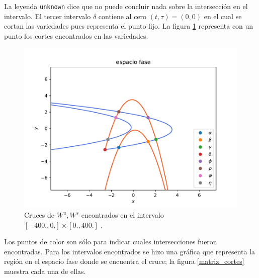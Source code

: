La leyenda \texttt{unknown} dice que no puede concluir nada sobre la intersección en el intervalo. El tercer intervalo $\delta$ contiene al cero $(t,\tau)=(0,0)$ en el cual se cortan las variedades pues representa el punto fijo. La figura \ref{crucesH} representa con un punto los cortes encontrados en las variedades.
\begin{figure}[H]
\centering
\includegraphics[scale=0.7]{crucesL}
\caption{Cruces de $W^{u},W^{s}$ encontrados en el intervalo $[-400.,0.] \times [0.,400.]$ .}
\label{crucesH}
\end{figure}
Los puntos de color son sólo para indicar cuales intersecciones fueron encontradas. Para los intervalos encontrados se hizo una gráfica que representa la región en el espacio fase donde se encuentra el cruce; la figura \ref{matriz_cortes} muestra cada una de ellas.

